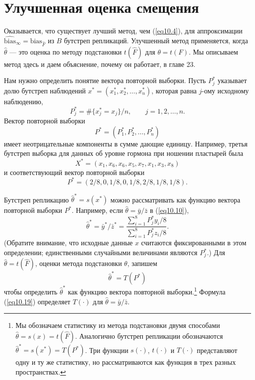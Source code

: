 \section{Улучшенная оценка смещения}

Оказывается, что существует лучший метод, чем (\ref{eq10.4}), для аппроксимации $\widehat{\text{bias}}_{\infty} = \text{bias}_{\hat{F}}$ из $B$ бутстреп репликаций. Улучшенный метод применяется, когда $\hat{\theta}$ --- это оценка по методу подстановки $t(\hat{F})$ для $\theta = t(F)$. Мы описываем метод здесь и даем объяснение, почему он работает, в главе 23.

Нам нужно определить понятие вектора повторной выборки. Пусть $P_{j}^{*}$ указывает долю бутстреп наблюдений $x^{*} = (x_{1}^{*}, x_{2}^{*}, \dots, x_{n}^{*})$, которая равна $j$-ому исходному наблюдению,
\begin{equation}
    P_{j}^{*} = \#\{x_{j}^{*} = x_{j}\}/n,\quad\quad j = 1, 2, \dots, n.
\end{equation}
Вектор повторной выборки
\begin{equation}\label{eq10.18}
    P^{*} = (P_{1}^{*}, P_{2}^{*}, \dots, P_{n}^{*})
\end{equation}
имеет неотрицательные компоненты в сумме дающие единицу. Например, третья бутстреп выборка для данных об уровне гормона при ношении пластырей была $$X^{*} = (x_1, x_6,x_6, x_5, x_7, x_1, x_3, x_8)$$ и соответствующий вектор повторной выборки $$P^* = (2/8, 0, 1/8, 0, 1/8,2/8, 1/8, 1/8).$$

Бутстреп репликацию $\hat{\theta}^{*} = s(x^{*})$ можно рассматривать как функцию вектора повторной выборки $P^{*}$. Например, если $\hat{\theta} = \bar{y}/\bar{z}$ в (\ref{eq10.10}),
\begin{equation}\label{eq10.19}
   \hat{\theta}^{*} = \bar{y}^{*}/\bar{z}^{*} = \frac{\sum_{i=1}^{8}P^{*}_{j}y_{i}/8}{\sum_{i=1}^{8}P^{*}_{j}z_{i}/8}.
\end{equation}
(Обратите внимание, что исходные данные $x$ считаются фиксированными в этом определении; единственными случайными величинами являются $P_{j}^{*}$.) Для $\hat{\theta} = t(\hat{F})$, оценки метода подстановки $\theta$, запишем
\begin{equation}\label{eq10.20}
   \hat{\theta}^{*} = T(P^{*})
\end{equation}
чтобы определить $\hat{\theta}^{*}$ как функцию вектора повторной выборки.\footnote{Мы обозначаем статистику из метода подстановки двумя способами $\hat{\theta} = s(x) = t(\hat{F})$. Аналогично бутстреп репликации обозначаются $\hat{\theta}^{*} = s(x^{*}) = T(P^{*})$. Три функции $s(\cdot)$, $t(\cdot)$ и $T(\cdot)$ представляют одну и ту же статистику, но рассматриваются как функция в трех разных пространствах.} Формула (\ref{eq10.19}) определяет $T(\cdot)$ для $\hat{\theta} = \bar{y}/\bar{z}$. 


